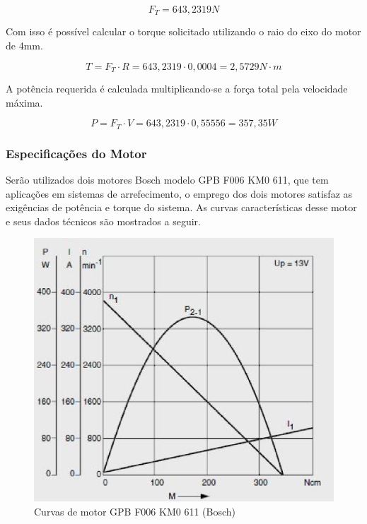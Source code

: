 \begin{equation}
F_{T} = 643,2319 N
\end{equation}

Com isso é possível calcular o torque solicitado utilizando o raio do eixo do motor de 4mm.

\begin{equation}
T = F_{T} \cdot R = 643,2319 \cdot 0,0004 = 2,5729 N \cdot m
\end{equation}

A potência requerida é calculada multiplicando-se a força total pela velocidade máxima.

\begin{equation}
P = F_{T} \cdot V = 643,2319 \cdot 0,55556 = 357,35 W
\end{equation}

\subsubsection{Especificações do Motor}

Serão utilizados dois motores Bosch modelo GPB F006 KM0 611, que tem aplicações
em sistemas de arrefecimento, o emprego dos dois motores satisfaz as exigências
de potência e torque do sistema. As curvas características desse motor e seus
dados técnicos são mostrados a seguir.

\begin{figure}[H]
  \centering
    \includegraphics[width=\textwidth]{figuras/motor.eps}
  \caption{Curvas de motor GPB F006 KM0 611 (Bosch)}
  \label{fig:motor}
\end{figure}

